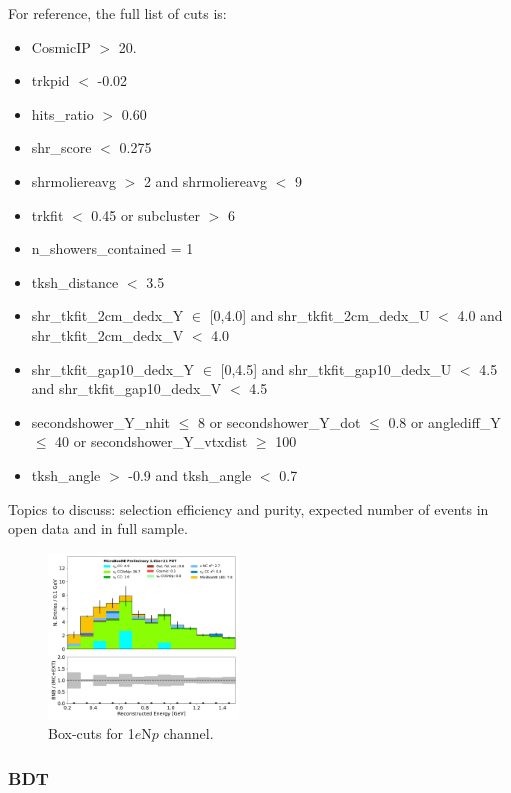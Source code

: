 \documentclass[a4paper]{article}
\begin{document}
For reference, the full list of cuts is:
\begin{itemize}
    \item CosmicIP $>$ 20.
    \item trkpid $<$ -0.02
    \item hits\_ratio $>$ 0.60
    \item shr\_score $<$ 0.275
    \item shrmoliereavg $>$ 2 and shrmoliereavg $<$ 9
    \item trkfit $<$ 0.45 or subcluster $>$ 6
    \item n\_showers\_contained = 1
    \item tksh\_distance $<$ 3.5
    \item shr\_tkfit\_2cm\_dedx\_Y $\in$ [0,4.0] and shr\_tkfit\_2cm\_dedx\_U $<$ 4.0 and shr\_tkfit\_2cm\_dedx\_V $<$ 4.0
    \item shr\_tkfit\_gap10\_dedx\_Y $\in$ [0,4.5] and shr\_tkfit\_gap10\_dedx\_U $<$ 4.5 and shr\_tkfit\_gap10\_dedx\_V $<$ 4.5
    \item secondshower\_Y\_nhit $\leq$ 8 or secondshower\_Y\_dot $\leq$ 0.8 or anglediff\_Y $\leq$ 40 or secondshower\_Y\_vtxdist $\geq$ 100
    \item tksh\_angle $>$ -0.9 and tksh\_angle $<$ 0.7
\end{itemize}

\par 
Topics to discuss: selection efficiency and purity, expected number of events in open data and in full sample.

\begin{figure}[ht]
\begin{center}
\includegraphics[width=0.45\textwidth]{1eNp/reco_e_01162020_box_RUN1.pdf}
\caption{\label{fig:1eNp:box:RUN1}Box-cuts for 1$e$N$p$ channel.}
\end{center}
\end{figure}

\subsubsection{BDT}
\end{document}
